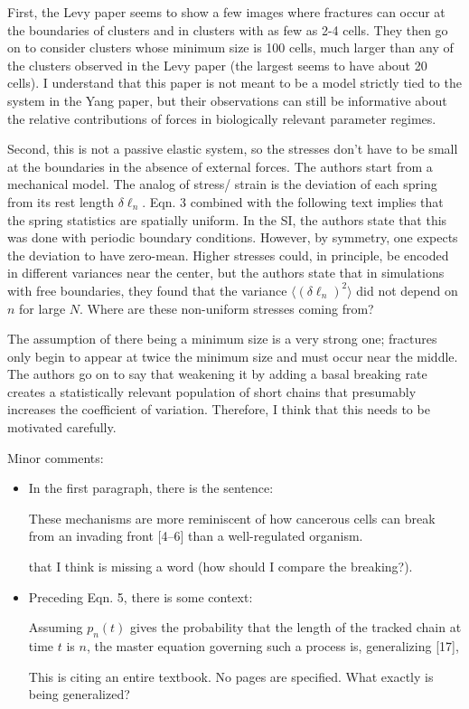 \documentclass[12pt,oneside,letterpaper]{article}
\begin{document}
\begin{itemize}
	First, the Levy paper seems to show a few images where fractures can occur at the boundaries of clusters and in clusters with as few as 2-4 cells. They then go on to consider clusters whose minimum size is 100 cells, much larger than any of the clusters observed in the Levy paper (the largest seems to have about 20 cells). I understand that this paper is not meant to be a model strictly tied to the system in the Yang paper, but their observations can still be informative about the relative contributions of forces in biologically relevant parameter regimes.
	
	Second, this is not a passive elastic system, so the stresses don't have to be small at the boundaries in the absence of external forces. The authors start from a mechanical model. The analog of stress/ strain is the deviation of each spring from its rest length $\delta \ell_n$. Eqn. 3 combined with the following text implies that the spring statistics are spatially uniform. In the SI, the authors state that this was done with periodic boundary conditions. However, by symmetry, one expects the deviation to have zero-mean. Higher stresses could, in principle, be encoded in different variances near the center, but the authors state that in simulations with free boundaries, they found that the variance $\langle (\delta \ell_n)^2\rangle$ did not depend on $n$ for large $N$. Where are these non-uniform stresses coming from?
	
	The assumption of there being a minimum size is a very strong one; fractures only begin to appear at twice the minimum size and must occur near the middle. The authors go on to say that weakening it by adding a basal breaking rate creates a statistically relevant population of short chains that presumably increases the coefficient of variation. Therefore, I think that this needs to be motivated carefully.
\end{itemize}

Minor comments:
\begin{itemize}
	\item In the first paragraph, there is the sentence:
	\begin{displayquote}
		These mechanisms are more reminiscent of how cancerous cells can break from an invading front [4–6] than a well-regulated organism.
	\end{displayquote}
	that I think is missing a word (how should I compare the breaking?).
	\item Preceding Eqn. 5, there is some context:
	\begin{displayquote}
		Assuming $p_n(t)$ gives the probability that the length of the tracked chain at time $t$ is $n$, the master equation governing such a process is, generalizing [17],
	\end{displayquote}
	This is citing an entire textbook. No pages are specified. What exactly is being generalized?
\end{itemize}
\end{document}
